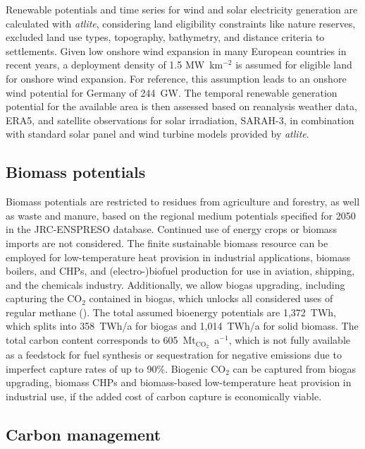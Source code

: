 Renewable potentials and time series for wind and solar electricity generation
are calculated with \textit{atlite},\cite{hofmannAtliteLightweight2021}
considering land eligibility constraints like nature reserves, excluded land use
types, topography, bathymetry, and distance criteria to settlements. Given low
onshore wind expansion in many European countries in recent
years,\cite{ourworldindataInstalledWind2023} a deployment density of 1.5
MW~km$^{-2}$ is assumed for eligible land for onshore wind
expansion.\cite{turkovskaLanduseRequirementsSolar2023a} For reference, this
assumption leads to an onshore wind potential for Germany of 244~GW. The
temporal renewable generation potential for the available area is then assessed
based on reanalysis weather data, ERA5,\cite{ecmwf} and satellite observations
for solar irradiation, SARAH-3,\cite{pfeifrothSurfaceRadiationData2023} in
combination with standard solar panel and wind turbine models provided by
\textit{atlite}.

\subsection*{Biomass potentials}
\label{sec:methods-biomass}

Biomass potentials are restricted to residues from agriculture and forestry, as
well as waste and manure, based on the regional medium potentials specified for
2050 in the JRC-ENSPRESO database.\cite{ruizENSPRESOOpen2019} Continued use of
energy crops or biomass imports are not considered. The finite sustainable
biomass resource can be employed for low-temperature heat provision in
industrial applications, biomass boilers, and CHPs, and (electro-)biofuel
production for use in aviation, shipping, and the chemicals industry.
Additionally, we allow biogas upgrading, including capturing the CO$_2$
contained in biogas, which unlocks all considered uses of regular methane
(). The total assumed bioenergy
potentials are 1,372~TWh, which splits into 358~TWh/a for biogas and 1,014~TWh/a
for solid biomass. The total carbon content corresponds to
605~Mt$_{\text{CO}_2}$~a$^{-1}$, which is not fully available as a feedstock for
fuel synthesis or sequestration for negative emissions due to imperfect capture
rates of up to 90\%. Biogenic CO$_2$ can be captured from biogas upgrading,
biomass CHPs and biomass-based low-temperature heat provision in industrial use,
if the added cost of carbon capture is economically viable.

\subsection*{Carbon management}
\label{sec:methods-carbon}

